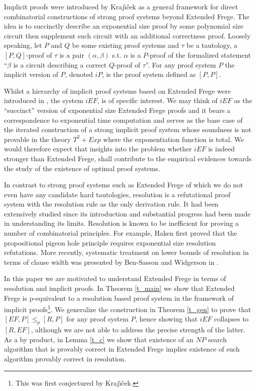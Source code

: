 \documentclass{LMCS}
\theoremstyle{plain}\newtheorem{satz}[thm]{Satz}
\begin{document}
Implicit proofs were introduced by Kraj{\'{\i}}{\v{c}}ek \cite{MR2058178} as a general framework for direct combinatorial constructions of strong proof systems beyond Extended Frege. The idea is to succinctly describe an exponential size proof by some polynomial size circuit then supplement such circuit with an additional correctness proof.
Loosely speaking, let $P$ and $Q$ be some existing proof systems and $\tau$ be a tautology, a $[P, Q]$-proof of $\tau$ is a pair $(\alpha, \beta)$ s.t. $\alpha$ is a $P$-proof of the formalized statement ``$\beta$ is a circuit describing a correct $Q$-proof of $\tau$''. For any proof system $P$ the implicit version of $P$, denoted $iP$, is the proof system defined as $[P,P]$.

Whilst a hierarchy of implicit proof systems based on Extended Frege were introduced in \cite{MR2058178}, the system $iEF$, is of specific interest. We may think of $iEF$ as the ``succinct'' version of exponential size Extended Frege proofs and it bears a correspondence to exponential time computation and serves as the base case of the iterated construction of a strong implicit proof system whose soundness is not provable in the theory $T^2+Exp$ where the exponentiation function is total. We would therefore expect that insights into the problem whether $iEF$ is indeed stronger than Extended Frege, shall contribute to the empirical evidences towards the study of the existence of optimal proof systems.

In contrast to strong proof systems such as Extended Frege of which we do not even have any candidate hard tautologies, resolution is a refutational proof system with the resolution rule as the only derivation rule. It had been extensively studied since its introduction and substantial progress had been made in understanding its limits. Resolution is known to be inefficient for proving a number of combinatorial principles. For example, Haken \cite{MR821207} first proved that the propositional pigeon hole principle requires exponential size resolution refutations. More recently, systematic treatment on lower bounds of resolution in terms of clause width was presented by Ben-Sasson and Widgerson in \cite{MR1868713}.

In this paper we are motivated to understand Extended Frege in terms of resolution and implicit proofs. In Theorem \ref{t_main} we show that Extended Frege is p-equivalent to a resolution based proof system in the framework of implicit proofs\footnote{This was first conjectured by Kraj{\'{\i}}{\v{c}}ek.}. We generalize the construction in Theorem \ref{t_gen} to prove that $[EF,P] \leq_p [R,P]$ for any proof system $P$, hence showing that $iEF$ collapses to $[R,EF]$, although we are not able to address the precise strength of the latter. As a by product, in Lemma \ref{t_c} we show that existence of an $NP$ search algorithm that is provably correct in Extended Frege implies existence of such algorithm provably correct in resolution.
\end{document}
